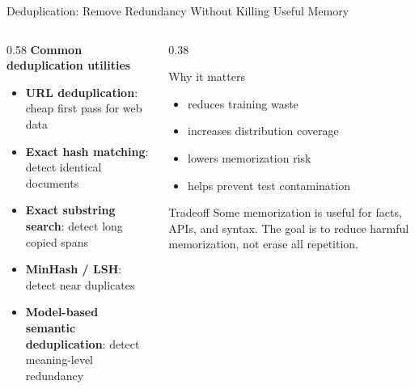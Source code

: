 \documentclass[aspectratio=169]{beamer}
\begin{document}
\begin{frame}{Deduplication: Remove Redundancy Without Killing Useful Memory}

\begin{columns}[T,totalwidth=\textwidth]

\begin{column}{0.58\textwidth}
\textbf{Common deduplication utilities}
\begin{itemize}
  \item \textbf{URL deduplication}: cheap first pass for web data
  \item \textbf{Exact hash matching}: detect identical documents
  \item \textbf{Exact substring search}: detect long copied spans
  \item \textbf{MinHash / LSH}: detect near duplicates
  \item \textbf{Model-based semantic deduplication}: detect meaning-level redundancy
\end{itemize}
\end{column}

\begin{column}{0.38\textwidth}
\begin{block}{Why it matters}
\begin{itemize}
  \item reduces training waste
  \item increases distribution coverage
  \item lowers memorization risk
  \item helps prevent test contamination
\end{itemize}
\end{block}

\begin{alertblock}{Tradeoff}
Some memorization is useful for facts, APIs, and syntax. The goal is to reduce harmful memorization, not erase all repetition.
\end{alertblock}
\end{column}

\end{columns}

\end{frame}
\end{document}
